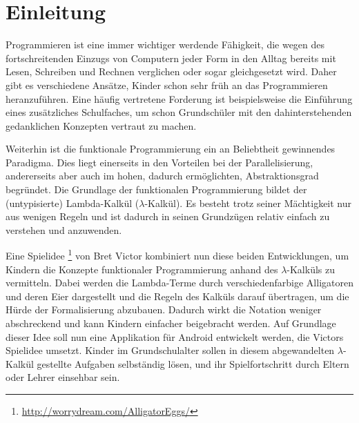 \section{Einleitung}

Programmieren ist eine immer wichtiger werdende Fähigkeit, die wegen des fortschreitenden Einzugs von Computern jeder Form in den Alltag bereits mit Lesen, Schreiben und Rechnen verglichen oder sogar gleichgesetzt wird.
Daher gibt es verschiedene Ansätze, Kinder schon sehr früh an das Programmieren heranzuführen.
Eine häufig vertretene Forderung ist beispielsweise die Einführung eines zusätzliches Schulfaches, um schon Grundschüler mit den dahinterstehenden gedanklichen Konzepten vertraut zu machen.

Weiterhin ist die funktionale Programmierung ein an Beliebtheit gewinnendes Paradigma.
Dies liegt einerseits in den Vorteilen bei der Parallelisierung, andererseits aber auch im hohen, dadurch ermöglichten, Abstraktionsgrad begründet.
Die Grundlage der funktionalen Programmierung bildet der (untypisierte) Lambda-Kalkül (\(\lambda\)-Kalkül).
Es besteht trotz seiner Mächtigkeit nur aus wenigen Regeln und ist dadurch in seinen Grundzügen relativ einfach zu verstehen und anzuwenden.

Eine Spielidee \footnote{\url{http://worrydream.com/AlligatorEggs/}} von Bret Victor kombiniert nun diese beiden Entwicklungen, um Kindern die Konzepte funktionaler Programmierung anhand des \(\lambda\)-Kalküls zu vermitteln.
Dabei werden die Lambda-Terme durch verschiedenfarbige Alligatoren und deren Eier dargestellt und die Regeln des Kalküls darauf übertragen, um die Hürde der Formalisierung abzubauen.
Dadurch wirkt die Notation weniger abschreckend und kann Kindern einfacher beigebracht werden.
Auf Grundlage dieser Idee soll nun eine Applikation für Android entwickelt werden, die Victors Spielidee umsetzt.
Kinder im Grundschulalter sollen in diesem abgewandelten \(\lambda\)-Kalkül gestellte Aufgaben selbständig lösen, und ihr Spielfortschritt durch Eltern oder Lehrer einsehbar sein.
